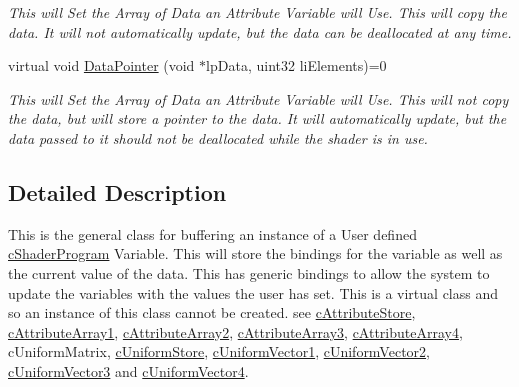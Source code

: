 \begin{DoxyCompactItemize}
\begin{DoxyCompactList}\small\item\em This will Set the Array of Data an Attribute Variable will Use. This will copy the data. It will not automatically update, but the data can be deallocated at any time. \end{DoxyCompactList}\item 
\hypertarget{classc_user_variable_a3056065bfb947fab5d28066f049fd49d}{
virtual void \hyperlink{classc_user_variable_a3056065bfb947fab5d28066f049fd49d}{DataPointer} (void $\ast$lpData, uint32 liElements)=0}
\label{classc_user_variable_a3056065bfb947fab5d28066f049fd49d}

\begin{DoxyCompactList}\small\item\em This will Set the Array of Data an Attribute Variable will Use. This will not copy the data, but will store a pointer to the data. It will automatically update, but the data passed to it should not be deallocated while the shader is in use. \end{DoxyCompactList}\end{DoxyCompactItemize}


\subsection{Detailed Description}
This is the general class for buffering an instance of a User defined \hyperlink{classc_shader_program}{cShaderProgram} Variable. This will store the bindings for the variable as well as the current value of the data. This has generic bindings to allow the system to update the variables with the values the user has set. This is a virtual class and so an instance of this class cannot be created. see \hyperlink{classc_attribute_store}{cAttributeStore}, \hyperlink{classc_attribute_array1}{cAttributeArray1}, \hyperlink{classc_attribute_array2}{cAttributeArray2}, \hyperlink{classc_attribute_array3}{cAttributeArray3}, \hyperlink{classc_attribute_array4}{cAttributeArray4}, cUniformMatrix, \hyperlink{classc_uniform_store}{cUniformStore}, \hyperlink{classc_uniform_vector1}{cUniformVector1}, \hyperlink{classc_uniform_vector2}{cUniformVector2}, \hyperlink{classc_uniform_vector3}{cUniformVector3} and \hyperlink{classc_uniform_vector4}{cUniformVector4}. 